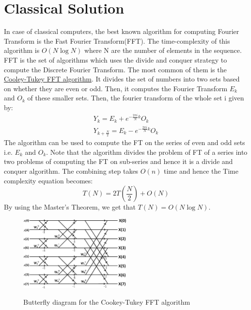 \section{Classical Solution}
In case of classical computers, the best known algorithm for computing Fourier Transform is the Fast Fourier Transform(FFT). The time-complexity of this algorithm is $O(N \log{N})$ where N are the number of elements in the sequence.\\
FFT is the set of algorithms which uses the divide and conquer strategy to compute the Discrete Fourier Transform. The most common of them is the \href{https://en.wikipedia.org/wiki/Cooley-Tukey_FFT_algorithm}{Cooley-Tukey FFT algorithm}. It divides the set of numbers into two sets based on whether they are even or odd. Then, it computes the Fourier Transform $E_k$ and $O_k$ of these smaller sets. Then, the fourier transform of the whole set i given by:
\begin{equation}
\begin{split}
Y_k = E_k + e^{-\frac{2\pi i}{N}k} O_k\\
Y_{k+\frac{N}{2}} = E_k - e^{-\frac{2\pi i}{N}k} O_k
\end{split}
\end{equation}The algorithm can be used to compute the FT on the series of even and odd sets i.e. $E_k$ and $O_k$. Note that the algorithm divides the problem of FT of a series into two problems of computing the FT on sub-series and hence it is a divide and conquer algorithm. The combining step takes $O(n)$ time and hence the Time complexity equation becomes:
\begin{equation}
T(N) = 2T(\frac{N}{2}) + O(N)
\end{equation}By using the Master's Theorem, we get that $T(N) = O(N \log{N})$.
\begin{figure}[h]
\centering
\includegraphics[width=0.5\textwidth]{images/fft.png}
\label{fft}
\caption{Butterfly diagram for the Cookey-Tukey FFT algorithm}
\end{figure}
